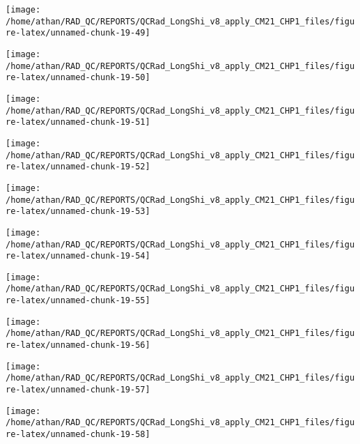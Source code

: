 \documentclass[
  10pt,
  a4paper,oneside]{article}
\begin{document}
\begin{center}\texttt{[image: /home/athan/RAD\_QC/REPORTS/QCRad\_LongShi\_v8\_apply\_CM21\_CHP1\_files/figure-latex/unnamed-chunk-19-49]} \end{center}

\begin{center}\texttt{[image: /home/athan/RAD\_QC/REPORTS/QCRad\_LongShi\_v8\_apply\_CM21\_CHP1\_files/figure-latex/unnamed-chunk-19-50]} \end{center}

\begin{center}\texttt{[image: /home/athan/RAD\_QC/REPORTS/QCRad\_LongShi\_v8\_apply\_CM21\_CHP1\_files/figure-latex/unnamed-chunk-19-51]} \end{center}

\begin{center}\texttt{[image: /home/athan/RAD\_QC/REPORTS/QCRad\_LongShi\_v8\_apply\_CM21\_CHP1\_files/figure-latex/unnamed-chunk-19-52]} \end{center}

\begin{center}\texttt{[image: /home/athan/RAD\_QC/REPORTS/QCRad\_LongShi\_v8\_apply\_CM21\_CHP1\_files/figure-latex/unnamed-chunk-19-53]} \end{center}

\begin{center}\texttt{[image: /home/athan/RAD\_QC/REPORTS/QCRad\_LongShi\_v8\_apply\_CM21\_CHP1\_files/figure-latex/unnamed-chunk-19-54]} \end{center}

\begin{center}\texttt{[image: /home/athan/RAD\_QC/REPORTS/QCRad\_LongShi\_v8\_apply\_CM21\_CHP1\_files/figure-latex/unnamed-chunk-19-55]} \end{center}

\begin{center}\texttt{[image: /home/athan/RAD\_QC/REPORTS/QCRad\_LongShi\_v8\_apply\_CM21\_CHP1\_files/figure-latex/unnamed-chunk-19-56]} \end{center}

\begin{center}\texttt{[image: /home/athan/RAD\_QC/REPORTS/QCRad\_LongShi\_v8\_apply\_CM21\_CHP1\_files/figure-latex/unnamed-chunk-19-57]} \end{center}

\begin{center}\texttt{[image: /home/athan/RAD\_QC/REPORTS/QCRad\_LongShi\_v8\_apply\_CM21\_CHP1\_files/figure-latex/unnamed-chunk-19-58]} \end{center}
\end{document}
